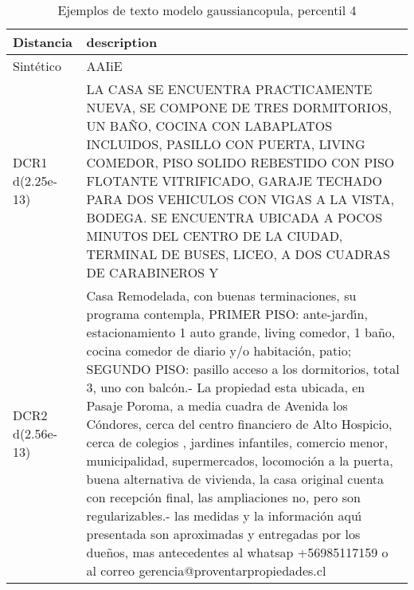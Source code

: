 \begin{table}[H]
\centering
\fontsize{10}{14}\selectfont
\caption{Ejemplos de texto modelo gaussiancopula, percentil 4}
\label{table-example-economicos-b-3-gaussiancopula-4p-text}
\begin{tabular}{|l|m{35em}|}
\hline
\rowcolor[gray]{0.8}
Distancia & description \\
\hline Sintético & AAIiE \\
\hline DCR1 d(2.25e-13) & LA CASA SE ENCUENTRA PRACTICAMENTE NUEVA, SE COMPONE DE TRES DORMITORIOS, UN BA\~NO, COCINA CON LABAPLATOS INCLUIDOS, PASILLO CON PUERTA, LIVING COMEDOR, PISO SOLIDO REBESTIDO CON PISO FLOTANTE VITRIFICADO, GARAJE TECHADO PARA DOS VEHICULOS CON VIGAS A LA VISTA, BODEGA. SE ENCUENTRA UBICADA A POCOS MINUTOS DEL CENTRO DE LA CIUDAD, TERMINAL DE BUSES, LICEO, A DOS CUADRAS DE CARABINEROS Y  \\
\hline DCR2 d(2.56e-13) & Casa Remodelada, con buenas terminaciones, su programa contempla, PRIMER PISO: ante-jard{\'\i}n, estacionamiento 1 auto grande, living comedor, 1 ba\~no, cocina comedor de diario y/o habitaci\'on, patio; SEGUNDO PISO: pasillo acceso a los dormitorios, total 3, uno con balc\'on.- La propiedad esta ubicada, en Pasaje Poroma, a media cuadra de Avenida los C\'ondores, cerca del centro financiero de Alto Hospicio, cerca de colegios , jardines infantiles, comercio menor, municipalidad, supermercados, locomoci\'on a la puerta, buena alternativa de vivienda, la casa original cuenta con recepci\'on final, las ampliaciones no, pero son regularizables.-
las medidas y la informaci\'on aqu{\'\i} presentada son aproximadas y entregadas por los due\~nos, mas antecedentes al whatsap +56985117159 o al correo gerencia@proventarpropiedades.cl
  \\
\hline
\end{tabular}
\end{table}
